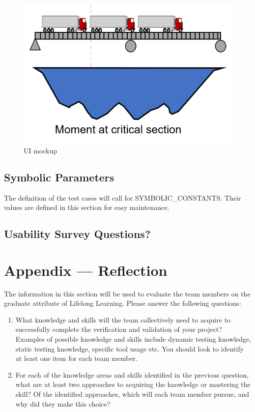 \documentclass[12pt, titlepage]{article}
\begin{document}
\begin{figure}[h]
  \includegraphics[width=\linewidth]{UI.png}
  \caption{UI mockup}
  \label {fig:ui-mockup}
\end{figure}

\subsection{Symbolic Parameters}

The definition of the test cases will call for SYMBOLIC\_CONSTANTS.
Their values are defined in this section for easy maintenance.

\subsection{Usability Survey Questions?}


\newpage{}
\section*{Appendix --- Reflection}

The information in this section will be used to evaluate the team members on the
graduate attribute of Lifelong Learning.  Please answer the following questions:

\begin{enumerate}
  \item What knowledge and skills will the team collectively need to acquire to
  successfully complete the verification and validation of your project?
  Examples of possible knowledge and skills include dynamic testing knowledge,
  static testing knowledge, specific tool usage etc.  You should look to
  identify at least one item for each team member.
  \item For each of the knowledge areas and skills identified in the previous
  question, what are at least two approaches to acquiring the knowledge or
  mastering the skill?  Of the identified approaches, which will each team
  member pursue, and why did they make this choice?
\end{enumerate}
\end{document}
